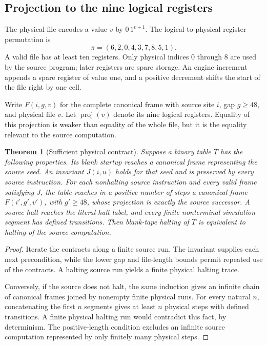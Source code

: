 \documentclass[11pt,letterpaper]{article}
\newtheorem{theorem}{Theorem}[section]
\begin{document}
\subsection{Projection to the nine logical registers}

The physical file encodes a value $v$ by $0\,1^{v+1}$. The logical-to-physical
register permutation is
\[
 \pi=(6,2,0,4,3,7,8,5,1).
\]
A valid file has at least ten registers. Only physical indices 0 through
8 are used by the source program; later registers are spare storage.
An engine increment appends a spare register of value one, and a positive
decrement shifts the start of the file right by one cell.

Write $F(i,g,v)$ for the complete canonical frame with source site $i$,
gap $g\ge48$, and physical file $v$. Let $\operatorname{proj}(v)$
denote its nine logical registers. Equality of this projection is weaker
than equality of the whole file, but it is the equality relevant to the
source computation.

\begin{theorem}[Sufficient physical contract]\label{thm:physical}
Suppose a binary table $T$ has the following properties.
Its blank startup reaches a canonical frame representing the source
seed. An invariant $J(i,u)$ holds for that seed and is preserved by
every source instruction. For each nonhalting source instruction and
every valid frame satisfying $J$, the table reaches in a positive number
of steps a canonical frame $F(i',g',v')$, with $g'\ge48$, whose
projection is exactly the source successor. A source halt reaches the
literal halt label, and every finite nonterminal simulation segment has
defined transitions. Then blank-tape halting of $T$ is equivalent to
halting of the source computation.
\end{theorem}

\begin{proof}
Iterate the contracts along a finite source run. The invariant supplies
each next precondition, while the lower gap and file-length bounds
permit repeated use of the contracts. A halting source run yields a
finite physical halting trace.

Conversely, if the source does not halt, the same induction gives an
infinite chain of canonical frames joined by nonempty finite physical
runs. For every natural $n$, concatenating the first $n$ segments gives
at least $n$ physical steps with defined transitions. A finite physical
halting run would contradict this fact, by determinism. The positive-length
condition excludes an infinite source computation represented by only
finitely many physical steps.
\end{proof}
\end{document}
